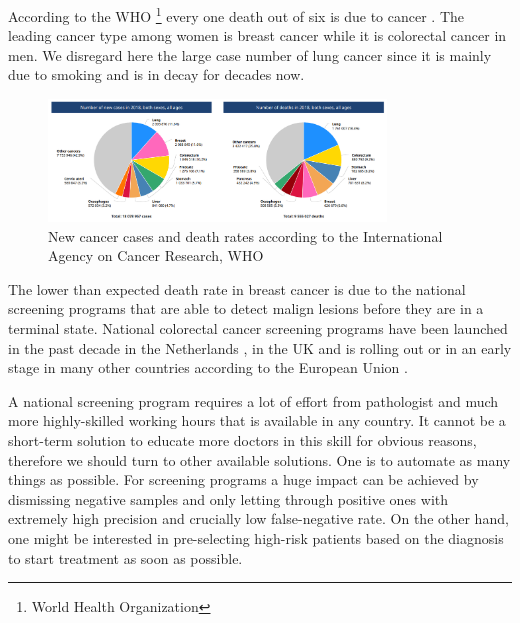 \documentclass[a4paper,12pt]{article}
\begin{document}
\vspace{4mm}

\par According to the WHO \footnote{World Health Organization} every one death out of six is due to cancer \cite{whoCANCER}. The leading cancer type among women is breast cancer while it is colorectal cancer in men. We disregard here the large case number of lung cancer since it is mainly due to smoking and is in decay for decades now.

\vspace{4mm}

\begin{figure}[H]
    \centering
    \includegraphics[width=0.8\textwidth]{all_cancer_pie_charts.png}
    \caption{New cancer cases and death rates according to the International Agency on Cancer Research,  WHO}
    \label{fig:cancer_pie_chart}
\end{figure}

\vspace{4mm}

\par The lower than expected death rate in breast cancer is due to the national screening programs that are able to detect malign lesions before they are in a terminal state. National colorectal cancer screening programs have been launched in the past decade in the Netherlands \cite{rivm_2014}, in the UK \cite{gov.uk_2015} and is rolling out or in an early stage in many other countries according to the European Union \cite{euReportOnCancer}.

\vspace{4mm}

\par A national screening program requires a lot of effort from pathologist and much more highly-skilled working hours that is available in any country. It cannot be a short-term solution to educate more doctors in this skill for obvious reasons, therefore we should turn to other available solutions. One is to automate as many things as possible. For screening programs a huge impact can be achieved by dismissing negative samples and only letting through positive ones with extremely high precision and crucially low false-negative rate. On the other hand, one might be interested in pre-selecting high-risk patients based on the diagnosis to start treatment as soon as possible.

\newpage



\end{document}
